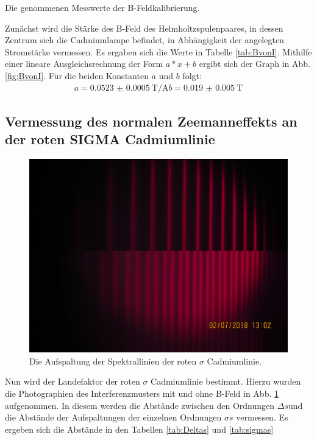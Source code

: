 \begin{table}
	\centering
	\caption{Die genommenen Messwerte der B-Feldkalibrierung.}
	
	
	\label{tab:BvonI}
\end{table}

Zunächst wird die Stärke des B-Feld des Helmholtzspulenpaares, in dessen Zentrum sich die Cadmiumlampe befindet, in Abhängigkeit der angelegten Stromstärke vermessen. Es ergaben sich die Werte in Tabelle \ref{tab:BvonI}. Mithilfe einer lineare Ausgleichsrechnung der Form $a*x+b$ ergibt sich der Graph in Abb. \ref{fig:BvonI}. Für die beiden Konstanten $a$ und $b$ folgt: 
\begin{gather}
	a = \SI{0.0523(5)}{\tesla\per\ampere}%
	b = \SI{0.019(5)}{\tesla}
\end{gather}

\subsection{Vermessung des normalen Zeemanneffekts an der roten SIGMA Cadmiumlinie}

\begin{figure}
	\centering
	\includegraphics[width=\linewidth-70pt,height=\textheight-70pt,keepaspectratio]{content/Images/normalb0und1.jpg}
	\caption{Die Aufspaltung der Spektrallinien der roten $\sigma$ Cadmiumlinie.}
	\label{fig:normal}
\end{figure}

Nun wird der Landefaktor der roten $\sigma$ Cadmiumlinie bestimmt. Hierzu wurden die Photographien des Interferenzmusters mit und ohne B-Feld in Abb. \ref{fig:normal} aufgenommen. In diesem werden die Abstände zwischen den Ordnungen $\Delta s$und die Abstände der Aufspaltungen der einzelnen Ordnungen $\sigma s$ vermessen. Es ergeben sich die Abstände in den Tabellen \ref{tab:Deltas} und \ref{tab:sigmas}

